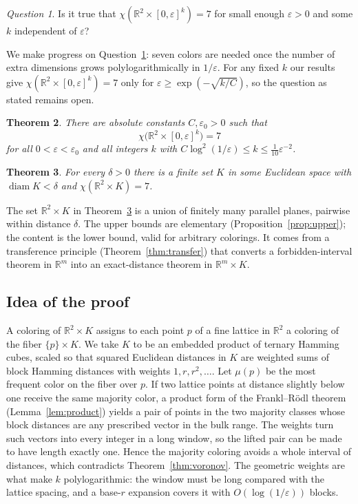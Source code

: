 \documentclass[11pt]{amsart}
\newtheorem{theorem}{Theorem}
\theoremstyle{definition}
\theoremstyle{remark}
\newtheorem{question}[theorem]{Question}
\newcommand{\R}{\mathbb{R}}
\begin{document}
\begin{question}\label{q:voronov}
Is it true that $\chi(\R^2\times[0,\varepsilon]^k)=7$ for small enough $\varepsilon>0$ and some
$k$ independent of $\varepsilon$?
\end{question}

We make progress on Question~\ref{q:voronov}: seven colors are needed once the number of extra
dimensions grows polylogarithmically in $1/\varepsilon$. For any fixed $k$ our results give
$\chi(\R^2\times[0,\varepsilon]^k)=7$ only for $\varepsilon\ge\exp(-\sqrt{k/C})$, so the question
as stated remains open.

\begin{theorem}\label{thm:slab}
There are absolute constants $C,\varepsilon_0>0$ such that
\[
  \chi\bigl(\R^2\times[0,\varepsilon]^k\bigr)=7
\]
for all $0<\varepsilon<\varepsilon_0$ and all integers $k$ with
$C\log^2(1/\varepsilon)\le k\le\tfrac1{10}\varepsilon^{-2}$.
\end{theorem}

\begin{theorem}\label{thm:main}
For every $\delta>0$ there is a finite set $K$ in some Euclidean space with
$\operatorname{diam}K<\delta$ and $\chi(\R^2\times K)=7$.
\end{theorem}

The set $\R^2\times K$ in Theorem~\ref{thm:main} is a union of finitely many parallel planes,
pairwise within distance $\delta$. The upper bounds are elementary
(Proposition~\ref{prop:upper}); the content is the lower bound, valid for arbitrary colorings.
It comes from a transference principle (Theorem~\ref{thm:transfer}) that converts a
forbidden-interval theorem in $\R^m$ into an exact-distance theorem in $\R^m\times K$.

\subsection*{Idea of the proof}
A coloring of $\R^2\times K$ assigns to each point $p$ of a fine lattice in $\R^2$ a coloring of
the fiber $\{p\}\times K$. We take $K$ to be an embedded product of ternary Hamming cubes,
scaled so that squared Euclidean distances in $K$ are weighted sums of block Hamming distances
with weights $1,r,r^2,\dots$. Let $\mu(p)$ be the most frequent color on the fiber over $p$. If
two lattice points at distance slightly below one receive the same majority color, a product
form of the Frankl--R\"odl theorem (Lemma~\ref{lem:product}) yields a pair of points in the two
majority classes whose block distances are any prescribed vector in the bulk range. The weights
turn such vectors into every integer in a long window, so the lifted pair can be made to have
length exactly one. Hence the majority coloring avoids a whole interval of distances, which
contradicts Theorem~\ref{thm:voronov}. The geometric weights are what make $k$
polylogarithmic: the window must be long compared with the lattice spacing, and a base-$r$
expansion covers it with $O(\log(1/\varepsilon))$ blocks.
\end{document}
